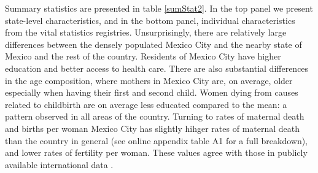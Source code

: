 \documentclass[a4paper, 11pt]{article}
\begin{document}
\begin{spacing}{2}
Summary statistics are presented in table \ref{sumStat2}.  In the top panel we present state-level characteristics, and in the bottom panel, individual characteristics from the vital statistics registries.  Unsurprisingly, there are relatively large differences between the densely populated Mexico City and the nearby state of Mexico and the rest of the country.  Residents of Mexico City have higher education and better access to health care. There are also substantial differences in the age composition, where mothers in Mexico City are, on average, older especially when having their first and second child.  Women dying from causes related to childbirth are on average less educated compared to the mean: a pattern observed in all areas of the country.  Turning to rates of maternal death and births per woman Mexico City has slightly hihger rates of maternal death than the country in general (see online appendix table A1 for a full breakdown), and lower rates of fertility per woman.  These values agree with those in publicly available international data \citep{WHO2015}.


\end{spacing}
\end{document}
